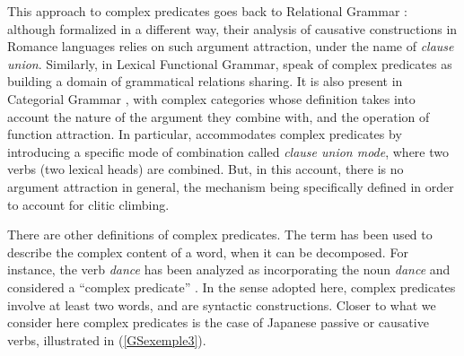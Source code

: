 \documentclass[output=paper
	        ,collection
	        ,collectionchapter
 	        ,biblatex
                ,babelshorthands
                ,newtxmath
                ,draftmode
                ,colorlinks, citecolor=brown
]{langscibook}
\begin{document}
{	\label{GSexemple1b}  
		
	\label{GSexemple1c} 
\zl


\eal 
	\label{GSexemple2} 
	\label{GSexemple2a}
		
	\label{GSexemple2b}
		
		
	\label{GSexemple2c}			
\zl


This approach to complex predicates goes back to Relational Grammar \citep{aissen1983clause}: although formalized in a different way, their analysis of causative constructions in Romance languages relies on such argument attraction, under the name of \emph{clause union}. Similarly, in Lexical Functional Grammar, \cite{andrews1999complex} speak of complex predicates as building a domain of grammatical relations sharing. It is also present in Categorial Grammar \citep{Geach70a}, with complex categories whose definition takes into account the nature of the argument they combine with, and the operation of function attraction. In particular, \cite[301]{kraak1998deductive} accommodates complex predicates by introducing a specific mode of combination called \emph{clause union mode}, where two verbs (two lexical heads) are combined. But, in this account, there is no argument attraction in general, the mechanism being specifically defined in order to account for clitic climbing.


There are other definitions of complex predicates. The term has been used to describe the complex content of a word, when it can be decomposed. For instance, the verb \emph{dance} has been analyzed as incorporating the noun \emph{dance} and considered a ``complex predicate'' \citep{HK97a-u}. In the sense adopted here, complex predicates involve at least two words, and are syntactic constructions. Closer to what we consider here complex predicates is the case of Japanese passive or causative verbs, illustrated in (\ref{GSexemple3}).

}
\end{document}
